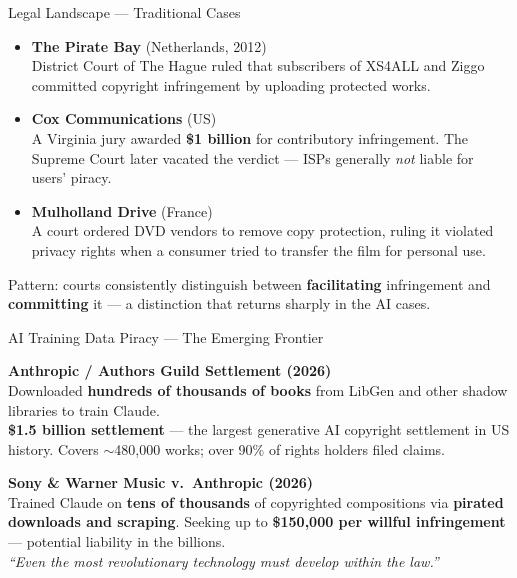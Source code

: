 \documentclass[aspectratio=169,11pt]{beamer}
\begin{document}
	\begin{frame}{Legal Landscape --- Traditional Cases}
		\begin{itemize}\itemsep0.8em
			\item \textbf{\color{ctpBlue}The Pirate Bay} {\footnotesize\color{ctpOverlay1}(Netherlands, 2012)}\\
			District Court of The Hague ruled that subscribers of XS4ALL and Ziggo committed copyright infringement by uploading protected works.
			\item \textbf{\color{ctpBlue}Cox Communications} {\footnotesize\color{ctpOverlay1}(US)}\\
			A Virginia jury awarded \textbf{\$1 billion} for contributory infringement. The Supreme Court later vacated the verdict --- ISPs generally \emph{not} liable for users' piracy.
			\item \textbf{\color{ctpBlue}Mulholland Drive} {\footnotesize\color{ctpOverlay1}(France)}\\
			A court ordered DVD vendors to remove copy protection, ruling it violated privacy rights when a consumer tried to transfer the film for personal use.
		\end{itemize}
		\vspace{0.4cm}
		\begin{infobox}
			\small Pattern: courts consistently distinguish between \textbf{facilitating} infringement and \textbf{committing} it --- a distinction that returns sharply in the AI cases.
		\end{infobox}
	\end{frame}
	
	\begin{frame}{AI Training Data Piracy --- The Emerging Frontier}
		\begin{dangerbox}
			\textbf{Anthropic / Authors Guild Settlement (2026)}\\[0.2cm]
			Downloaded \textbf{hundreds of thousands of books} from LibGen and other shadow libraries to train Claude.\\[0.15cm]
			\textbf{\$1.5 billion settlement} --- the largest generative AI copyright settlement in US history. Covers $\sim$480{,}000 works; over 90\% of rights holders filed claims.
		\end{dangerbox}
		\vspace{0.3cm}
		\begin{warningbox}
			\textbf{Sony \& Warner Music v.\ Anthropic (2026)}\\[0.2cm]
			Trained Claude on \textbf{tens of thousands} of copyrighted compositions via \textbf{pirated downloads and scraping}. Seeking up to \textbf{\$150{,}000 per willful infringement} --- potential liability in the billions.\\
			{\footnotesize\color{ctpOverlay1}\emph{``Even the most revolutionary technology must develop within the law.''}}
		\end{warningbox}
	\end{frame}
	
\end{document}
